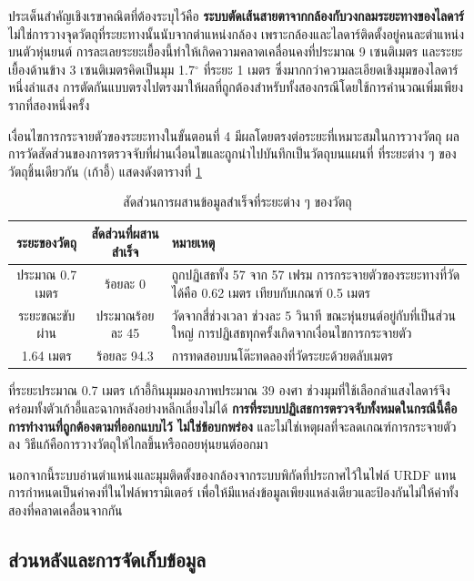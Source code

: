 \documentclass[a4paper,12pt]{report}
\begin{document}
ประเด็นสำคัญเชิงเรขาคณิตที่ต้องระบุไว้คือ
\textbf{ระบบตัดเส้นสายตาจากกล้องกับวงกลมระยะทางของไลดาร์}
ไม่ใช่การวางจุดวัตถุที่ระยะทางนั้นนับจากตำแหน่งกล้อง
เพราะกล้องและไลดาร์ติดตั้งอยู่คนละตำแหน่งบนตัวหุ่นยนต์
การละเลยระยะเยื้องนี้ทำให้เกิดความคลาดเคลื่อนคงที่ประมาณ 9 เซนติเมตร
และระยะเยื้องด้านข้าง 3 เซนติเมตรคิดเป็นมุม 1.7$^\circ$ ที่ระยะ 1 เมตร
ซึ่งมากกว่าความละเอียดเชิงมุมของไลดาร์หนึ่งลำแสง
การตัดกันแบบตรงไปตรงมาให้ผลที่ถูกต้องสำหรับทั้งสองกรณีโดยใช้การคำนวณเพิ่มเพียงรากที่สองหนึ่งครั้ง

เงื่อนไขการกระจายตัวของระยะทางในขั้นตอนที่ 4 มีผลโดยตรงต่อระยะที่เหมาะสมในการวางวัตถุ
ผลการวัดสัดส่วนของการตรวจจับที่ผ่านเงื่อนไขและถูกนำไปบันทึกเป็นวัตถุบนแผนที่
ที่ระยะต่าง ๆ ของวัตถุชิ้นเดียวกัน (เก้าอี้) แสดงดังตารางที่ \ref{tab:fuserange}

\begin{table}[htbp]
\centering
\caption[สัดส่วนการผสานข้อมูลสำเร็จที่ระยะต่าง ๆ ของวัตถุ (บทที่ 4)]{สัดส่วนการผสานข้อมูลสำเร็จที่ระยะต่าง ๆ ของวัตถุ}
\label{tab:fuserange}
\small
\begin{tabularx}{\textwidth}{|c|c|X|}
\hline
\textbf{ระยะของวัตถุ} & \textbf{สัดส่วนที่ผสานสำเร็จ} & \textbf{หมายเหตุ} \\
\hline
ประมาณ 0.7 เมตร & ร้อยละ 0 & ถูกปฏิเสธทั้ง 57 จาก 57 เฟรม
  การกระจายตัวของระยะทางที่วัดได้คือ 0.62 เมตร เทียบกับเกณฑ์ 0.5 เมตร \\
\hline
ระยะขณะขับผ่าน & ประมาณร้อยละ 45 & วัดจากสี่ช่วงเวลา ช่วงละ 5 วินาที
  ขณะหุ่นยนต์อยู่กับที่เป็นส่วนใหญ่ การปฏิเสธทุกครั้งเกิดจากเงื่อนไขการกระจายตัว \\
\hline
1.64 เมตร & ร้อยละ 94.3 & การทดสอบบนโต๊ะทดลองที่วัดระยะด้วยตลับเมตร \\
\hline
\end{tabularx}
\end{table}

ที่ระยะประมาณ 0.7 เมตร เก้าอี้กินมุมมองภาพประมาณ 39 องศา
ช่วงมุมที่ใช้เลือกลำแสงไลดาร์จึงคร่อมทั้งตัวเก้าอี้และฉากหลังอย่างหลีกเลี่ยงไม่ได้
\textbf{การที่ระบบปฏิเสธการตรวจจับทั้งหมดในกรณีนี้คือการทำงานที่ถูกต้องตามที่ออกแบบไว้
ไม่ใช่ข้อบกพร่อง} และไม่ใช่เหตุผลที่จะลดเกณฑ์การกระจายตัวลง
วิธีแก้คือการวางวัตถุให้ไกลขึ้นหรือถอยหุ่นยนต์ออกมา

นอกจากนี้ระบบอ่านตำแหน่งและมุมติดตั้งของกล้องจากระบบพิกัดที่ประกาศไว้ในไฟล์ URDF
แทนการกำหนดเป็นค่าคงที่ในไฟล์พารามิเตอร์
เพื่อให้มีแหล่งข้อมูลเพียงแหล่งเดียวและป้องกันไม่ให้ค่าทั้งสองที่คลาดเคลื่อนจากกัน


\subsection{ส่วนหลังและการจัดเก็บข้อมูล}
\end{document}
